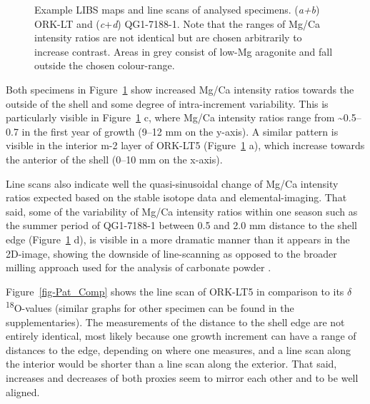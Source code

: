 \documentclass[
  authoryear,
  preprint,
  3p]{elsarticle}
\begin{document}
\begin{figure}[H]


\caption{\label{fig-Pat_LIBS}Example LIBS maps and line scans of
analysed specimens. (\emph{a+b}) ORK-LT and (\emph{c}+\emph{d})
QG1-7188-1. Note that the ranges of Mg/Ca intensity ratios are not
identical but are chosen arbitrarily to increase contrast. Areas in grey
consist of low-Mg aragonite and fall outside the chosen colour-range.}

\end{figure}%

Both specimens in Figure~\ref{fig-Pat_LIBS} show increased Mg/Ca
intensity ratios towards the outside of the shell and some degree of
intra-increment variability. This is particularly visible in
Figure~\ref{fig-Pat_LIBS} c, where Mg/Ca intensity ratios range from
\textasciitilde0.5--0.7 in the first year of growth (9--12 mm on the
y-axis). A similar pattern is visible in the interior m-2 layer of
ORK-LT5 (Figure~\ref{fig-Pat_LIBS} a), which increase towards the
anterior of the shell (0--10 mm on the x-axis).

Line scans also indicate well the quasi-sinusoidal change of Mg/Ca
intensity ratios expected based on the stable isotope data and
elemental-imaging. That said, some of the variability of Mg/Ca intensity
ratios within one season such as the summer period of QG1-7188-1 between
0.5 and 2.0 mm distance to the shell edge (Figure~\ref{fig-Pat_LIBS} d),
is visible in a more dramatic manner than it appears in the 2D-image,
showing the downside of line-scanning as opposed to the broader milling
approach used for the analysis of carbonate powder
\citep{Ferguson2011-zl}.

Figure~\ref{fig-Pat_Comp} shows the line scan of ORK-LT5 in comparison
to its \(\delta\)\textsuperscript{18}O-values (similar graphs for other
specimen can be found in the supplementaries). The measurements of the
distance to the shell edge are not entirely identical, most likely
because one growth increment can have a range of distances to the edge,
depending on where one measures, and a line scan along the interior
would be shorter than a line scan along the exterior. That said,
increases and decreases of both proxies seem to mirror each other and to
be well aligned.
\end{document}
